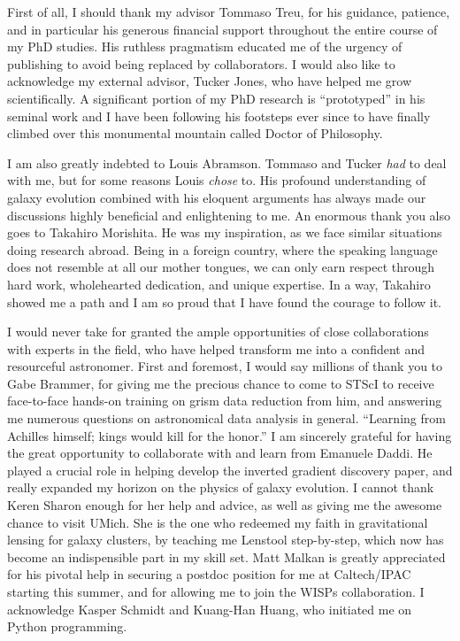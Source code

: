 
First of all, I should thank my advisor Tommaso Treu, for his guidance, patience, and in particular his generous financial
support throughout the entire course of my PhD studies.
His ruthless pragmatism educated me of the urgency of publishing to avoid being replaced by collaborators.
I would also like to acknowledge my external advisor, Tucker Jones, who have helped me grow scientifically.
A significant portion of my PhD research is ``prototyped'' in his seminal work and I have been following his footsteps
ever since to have finally climbed over this monumental mountain called Doctor of Philosophy.

I am also greatly indebted to Louis Abramson. Tommaso and Tucker \emph{had} to deal with me, but for some reasons Louis \emph{chose} to.
His profound understanding of galaxy evolution combined with his eloquent arguments has always made our discussions highly
beneficial and enlightening to me.
An enormous thank you also goes to Takahiro Morishita.
He was my inspiration, as we face similar situations doing research abroad.
Being in a foreign country, where the speaking language does not resemble at all our mother tongues,
we can only earn respect through hard work, wholehearted dedication, and unique expertise.
In a way, Takahiro showed me a path and I am so proud that I have found the courage to follow it.

I would never take for granted the ample opportunities of close collaborations with experts in the field, who have
helped transform me into a confident and resourceful astronomer.
First and foremost, I would say millions of thank you to Gabe Brammer, for giving me the precious chance to come to STScI to
receive face-to-face hands-on training on grism data reduction from him, and answering me numerous questions on
astronomical data analysis in general.  ``Learning from Achilles himself; kings would kill for the honor.'' I am
sincerely grateful for having the great opportunity to collaborate with and learn from Emanuele Daddi.  He played
a crucial role in helping develop the inverted gradient discovery paper, and really expanded my horizon on the
physics of galaxy evolution. I cannot thank Keren Sharon enough for her help and advice, as well as giving me the
awesome chance to visit UMich.  She is the one who redeemed my faith in gravitational lensing
for galaxy clusters, by teaching me Lenstool step-by-step, which now has become an indispensible part in my skill
set.  Matt Malkan is greatly appreciated for his pivotal help in securing a postdoc position for me at
Caltech/IPAC starting this summer, and for allowing me to join the WISPs collaboration.  I acknowledge Kasper
Schmidt and Kuang-Han Huang, who initiated me on Python programming.


